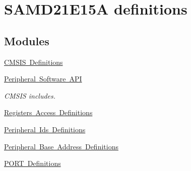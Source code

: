 \hypertarget{group___s_a_m_d21_e15_a__definitions}{}\section{S\+A\+M\+D21\+E15A definitions}
\label{group___s_a_m_d21_e15_a__definitions}
\subsection*{Modules}
\begin{DoxyCompactItemize}
\item 
\mbox{\hyperlink{group___s_a_m_d21_e15_a__cmsis}{C\+M\+S\+I\+S Definitions}}
\item 
\mbox{\hyperlink{group___s_a_m_d21_e15_a__api}{Peripheral Software A\+PI}}
\begin{DoxyCompactList}\small\item\em C\+M\+S\+IS includes. \end{DoxyCompactList}\item 
\mbox{\hyperlink{group___s_a_m_d21_e15_a__reg}{Registers Access Definitions}}
\item 
\mbox{\hyperlink{group___s_a_m_d21_e15_a__id}{Peripheral Ids Definitions}}
\item 
\mbox{\hyperlink{group___s_a_m_d21_e15_a__base}{Peripheral Base Address Definitions}}
\item 
\mbox{\hyperlink{group___s_a_m_d21_e15_a__port}{P\+O\+R\+T Definitions}}
\end{DoxyCompactItemize}
